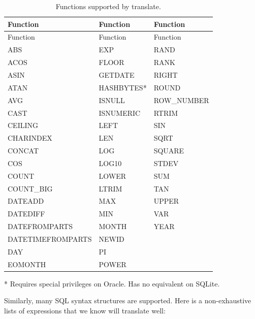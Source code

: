 \documentclass[11pt]{book}
\theoremstyle{definition}
\theoremstyle{definition}
\theoremstyle{definition}
\theoremstyle{remark}
\begin{document}
\begin{longtable}[]{@{}lll@{}}
\caption{\label{tab:sqlFunctions} Functions supported by translate.}\tabularnewline
\toprule
Function & Function & Function\tabularnewline
\midrule
\endfirsthead
\toprule
Function & Function & Function\tabularnewline
\midrule
\endhead
ABS & EXP & RAND\tabularnewline
ACOS & FLOOR & RANK\tabularnewline
ASIN & GETDATE & RIGHT\tabularnewline
ATAN & HASHBYTES* & ROUND\tabularnewline
AVG & ISNULL & ROW\_NUMBER\tabularnewline
CAST & ISNUMERIC & RTRIM\tabularnewline
CEILING & LEFT & SIN\tabularnewline
CHARINDEX & LEN & SQRT\tabularnewline
CONCAT & LOG & SQUARE\tabularnewline
COS & LOG10 & STDEV\tabularnewline
COUNT & LOWER & SUM\tabularnewline
COUNT\_BIG & LTRIM & TAN\tabularnewline
DATEADD & MAX & UPPER\tabularnewline
DATEDIFF & MIN & VAR\tabularnewline
DATEFROMPARTS & MONTH & YEAR\tabularnewline
DATETIMEFROMPARTS & NEWID &\tabularnewline
DAY & PI &\tabularnewline
EOMONTH & POWER &\tabularnewline
\bottomrule
\end{longtable}

* Requires special privileges on Oracle. Has no equivalent on SQLite.

Similarly, many SQL syntax structures are supported. Here is a non-exhaustive lists of expressions that we know will translate well:
\end{document}

